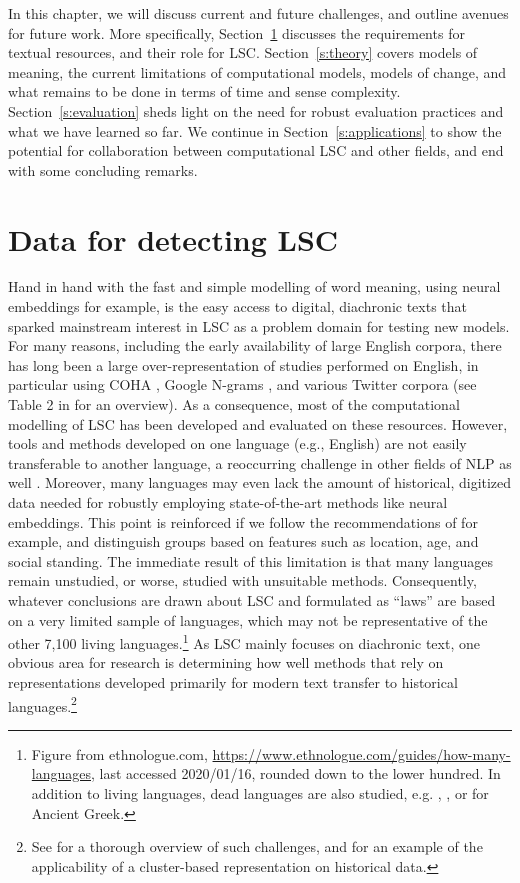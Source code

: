 \documentclass[output=paper]{langscibook}
\begin{document}
In this chapter, we will discuss current and future challenges, and outline avenues for future work. More specifically, Section~\ref{s:data} discusses the requirements for textual resources, and their role for LSC. Section~\ref{s:theory} covers models of meaning, the current limitations of computational models, models of change, and what remains to be done in terms of time and sense complexity. 
Section~\ref{s:evaluation} sheds light on the need for robust evaluation practices and what we have learned so far. 
 We continue in Section~\ref{s:applications} to show the potential for collaboration between computational LSC and other fields, and end with some concluding remarks. 

\section{Data for detecting LSC}
\label{s:data}
Hand in hand with the fast and simple modelling of word meaning, 
using neural embeddings for example, is the easy access to digital, diachronic texts that sparked mainstream interest in LSC as a problem domain for testing new models. For many reasons, including the early availability of large English corpora, there has long been a large over-representation of studies performed on English, in particular using COHA \citep{davies2002corpus}, Google N-grams \citep{michel2011quantitative}, and various Twitter corpora (see Table 2 in \citealt{tahmasebi2018survey} for an overview). As a consequence, most of the computational modelling of LSC has been developed and evaluated on these resources. However, tools and methods developed on one language (e.g., English) are not easily transferable to another language, a reoccurring challenge in other fields of NLP as well \citep{bender-2011, ponti:2019cl}. Moreover, many languages may even lack the amount of historical, digitized data needed for robustly employing state-of-the-art methods like neural embeddings. This point is reinforced if we follow the recommendations of \citet{bowern2019semantic} for example, and distinguish groups based on features such as location, age, and social standing. The immediate result of this limitation is that many languages remain unstudied, or worse, studied with unsuitable methods. Consequently, whatever conclusions are drawn about LSC and formulated as ``laws'' are based on a very limited sample of languages, which may not be representative of the other 7,100 living languages.\footnote{Figure from ethnologue.com, \url{https://www.ethnologue.com/guides/how-many-languages}, last accessed 2020/01/16, rounded down to the lower hundred. In addition to living languages, dead languages are also studied, e.g. \citet{rodda2016panta-journal}, \citet{perrone-etal-2019-gasc}, or \citet{mcgillivray2019computational} for Ancient Greek.} 
As LSC mainly focuses on diachronic text, one obvious area for research is determining how well methods that rely on representations developed primarily for modern text transfer to historical languages.\footnote{See \citet{piotrowski2012natural} for a thorough overview of such challenges, and \citet{tahmasebi2013applicability} for an example of the applicability of a cluster-based representation on historical data.}\\
\end{document}
